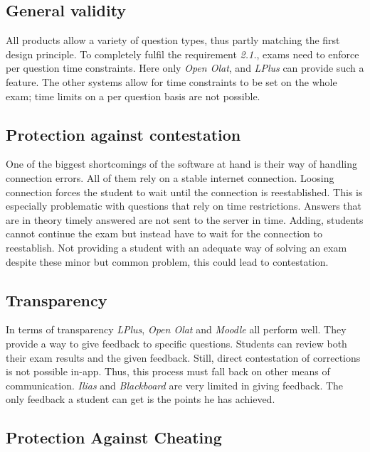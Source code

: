 \hypertarget{general-validity-1}{%
\subsection{General validity}\label{general-validity-1}}

All products allow a variety of question types, thus partly matching the
first design principle. To completely fulfil the requirement
\emph{2.1.}, exams need to enforce per question time constraints. Here
only \emph{Open Olat}, and \emph{LPlus} can provide such a feature. The
other systems allow for time constraints to be set on the whole exam;
time limits on a per question basis are not possible.

\hypertarget{protection-against-contestation-1}{%
\subsection{Protection against
contestation}\label{protection-against-contestation-1}}

One of the biggest shortcomings of the software at hand is their way of
handling connection errors. All of them rely on a stable internet
connection. Loosing connection forces the student to wait until the
connection is reestablished. This is especially problematic with
questions that rely on time restrictions. Answers that are in theory
timely answered are not sent to the server in time. Adding, students
cannot continue the exam but instead have to wait for the connection to
reestablish. Not providing a student with an adequate way of solving an
exam despite these minor but common problem, this could lead to
contestation.

\hypertarget{transparency-1}{%
\subsection{Transparency}\label{transparency-1}}

In terms of transparency \emph{LPlus}, \emph{Open Olat} and
\emph{Moodle} all perform well. They provide a way to give feedback to
specific questions. Students can review both their exam results and the
given feedback. Still, direct contestation of corrections is not
possible in-app. Thus, this process must fall back on other means of
communication. \emph{Ilias} and \emph{Blackboard} are very limited in
giving feedback. The only feedback a student can get is the points he
has achieved.

\hypertarget{protection-against-cheating-1}{%
\subsection{Protection Against
Cheating}\label{protection-against-cheating-1}}

